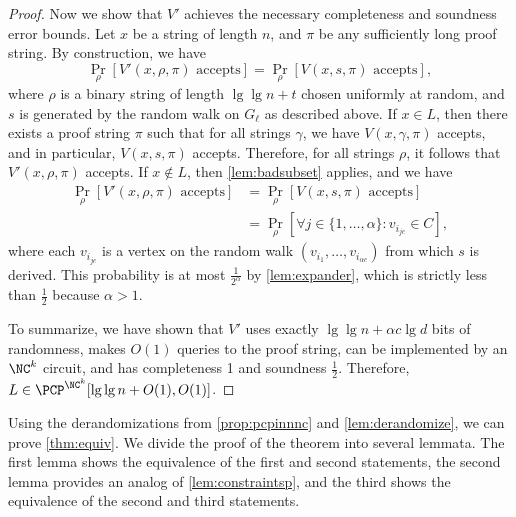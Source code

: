 \documentclass{article}
\begin{document}
\begin{proof}
  Now we show that $V'$ achieves the necessary completeness and soundness error bounds.
  Let $x$ be a string of length $n$, and $\pi$ be any sufficiently long proof string.
  By construction, we have
  \begin{equation*}
    \Pr_\rho[V'(x, \rho, \pi) \text{ accepts}] = \Pr_\rho[V(x, s, \pi) \text{ accepts}],
  \end{equation*}
  where $\rho$ is a binary string of length $\lg \lg n + t$ chosen uniformly at random, and $s$ is generated by the random walk on $G_\ell$ as described above.
  If $x \in L$, then there exists a proof string $\pi$ such that for all strings $\gamma$, we have $V(x, \gamma, \pi)$ accepts, and in particular, $V(x, s, \pi)$ accepts.
  Therefore, for all strings $\rho$, it follows that $V'(x, \rho, \pi)$ accepts.
  If $x \notin L$, then \autoref{lem:badsubset} applies, and we have
  \begin{align*}
    \Pr_\rho[V'(x, \rho, \pi) \text{ accepts}] & = \Pr_\rho[V(x, s, \pi) \text{ accepts}] \\
    & = \Pr_\rho[\forall j \in \{1, \dotsc, \alpha\} \colon v_{i_{jc}} \in C],
  \end{align*}
  where each $v_{i_{jc}}$ is a vertex on the random walk $(v_{i_1}, \dotsc, v_{i_{\alpha c}})$ from which $s$ is derived.
  This probability is at most $\frac{1}{2^\alpha}$ by \autoref{lem:expander}, which is strictly less than $\frac{1}{2}$ because $\alpha > 1$.

  To summarize, we have shown that $V'$ uses exactly $\lg \lg n + \alpha c \lg d$ bits of randomness, makes $O(1)$ queries to the proof string, can be implemented by an $\NC^k$ circuit, and has completeness 1 and soundness $\frac{1}{2}$.
  Therefore, $L \in \PCP^{\NC^k}[\lg \lg n + O(1), O(1)]$.
\end{proof}

Using the derandomizations from \autoref{prop:pcpinnnc} and \autoref{lem:derandomize}, we can prove \autoref{thm:equiv}.
We divide the proof of the theorem into several lemmata.
The first lemma shows the equivalence of the first and second statements, the second lemma provides an \NC{} analog of \autoref{lem:constraintsp}, and the third shows the equivalence of the second and third statements.
\end{document}
